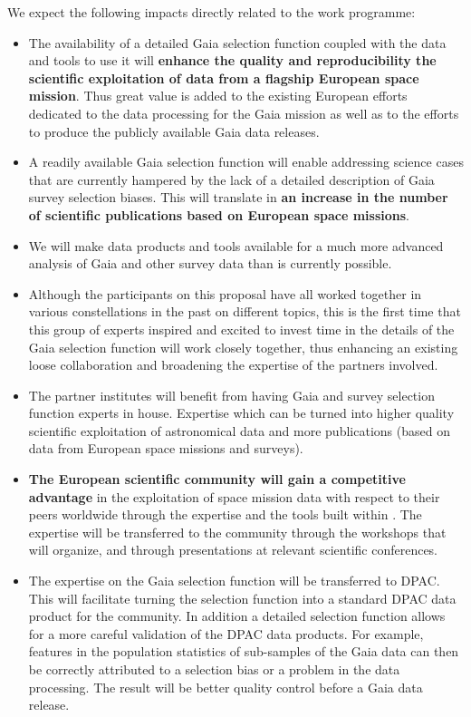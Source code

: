 We expect the following impacts directly related to the work programme:
\begin{itemize}
    \item The availability of a detailed Gaia selection function coupled with the data and tools to use it will \textbf{enhance the quality and reproducibility the scientific exploitation of data from a flagship European space mission}. Thus great value is added to the existing European efforts dedicated to the data processing for the Gaia mission as well as to the efforts to produce the publicly available Gaia data releases.
    \item A readily available Gaia selection function will enable addressing science cases that are currently hampered by the lack of a detailed description of Gaia survey selection biases. This will translate in \textbf{an increase in the number of scientific publications based on European space missions}.
    \item We will make data products and tools available for a much more advanced analysis of Gaia and other survey data than is currently possible.
    \item Although the participants on this proposal have all worked together in various constellations in the past on different topics, this is the first time that this group of experts inspired and excited to invest time in the details of the Gaia selection function will work closely together, thus enhancing an existing loose collaboration and broadening the expertise of the partners involved.
    \item The partner institutes will benefit from having Gaia and survey selection function experts in house. Expertise which can be turned into higher quality scientific exploitation of astronomical data and more publications (based on data from European space missions and surveys).
    \item \textbf{The European scientific community will gain a competitive advantage} in the exploitation of space mission data with respect to their peers worldwide through the expertise and the tools built within {\acro}. The expertise will be transferred to the community through the workshops that {\acro} will organize, and through presentations at relevant scientific conferences.
    \item The expertise on the Gaia selection function will be transferred to DPAC. This will facilitate turning the selection function into a standard DPAC data product for the community. In addition a detailed selection function allows for a more careful validation of the DPAC data products. For example, features in the population statistics of sub-samples of the Gaia data can then be correctly attributed to a selection bias or a problem in the data processing. The result will be better quality control before a Gaia data release.

\end{itemize}
